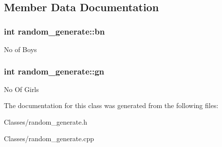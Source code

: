 \subsection{Member Data Documentation}
\hypertarget{classrandom__generate_a0947bf806ea49f4662873a8fc650576a}{
\subsubsection[{bn}]{\setlength{\rightskip}{0pt plus 5cm}int random\-\_\-generate\-::bn}}\label{classrandom__generate_a0947bf806ea49f4662873a8fc650576a}
No of Boys \hypertarget{classrandom__generate_a51af0a6897932e60fd2fe8c318889e25}{
\subsubsection[{gn}]{\setlength{\rightskip}{0pt plus 5cm}int random\-\_\-generate\-::gn}}\label{classrandom__generate_a51af0a6897932e60fd2fe8c318889e25}
No Of Girls 

The documentation for this class was generated from the following files\-:\begin{DoxyCompactItemize}
\item 
Classes/random\-\_\-generate.\-h\item 
Classes/random\-\_\-generate.\-cpp\end{DoxyCompactItemize}
